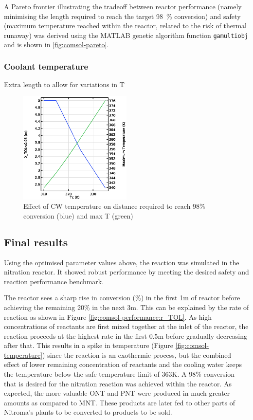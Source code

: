 A Pareto frontier illustrating the tradeoff between reactor performance (namely minimising the length required to reach the target \SI{98}{\percent} conversion) and safety (maximum temperature reached within the reactor, related to the risk of thermal runaway) was derived using the MATLAB genetic algorithm function \texttt{gamultiobj} and is shown in \cref{fig:comsol-pareto}.

\subsubsection{Coolant temperature}
Extra length to allow for variations in T

\begin{figure}
    \vspace{-\intextsep}
    \includegraphics[width=0.5\textwidth]{figures/S4-CW-X-T.eps}
    \caption{Effect of CW temperature on distance required to reach 98\% conversion (blue) and max T (green)}
    \label{fig:comsol-S4-CW-X-T}
\end{figure}

\subsection{Final results}
Using the optimised parameter values above, the reaction was simulated in the nitration reactor. It showed robust performance by meeting the desired safety and reaction performance benchmark.

The reactor sees a sharp rise in conversion (\%) in the first 1m of reactor before achieving the remaining 20\% in the next \approx 3m. This can be explained by the rate of reaction as shown in Figure \ref{fig:comsol-performance:r_TOL}. As high concentrations of reactants are first mixed together at the inlet of the reactor, the reaction proceeds at the highest rate in the first 0.5m before gradually decreasing after that. This results in a spike in temperature (Figure \ref{fig:comsol-temperature}) since the reaction is an exothermic process, but the combined effect of lower remaining concentration of reactants and the cooling water keeps the temperature below the safe temperature limit of 363K. A 98\% conversion that is desired for the nitration reaction was achieved within the reactor. As expected, the more valuable ONT and PNT were produced in much greater amounts as compared to MNT. These products are later fed to other parts of Nitroma's plants to be converted to products to be sold.

